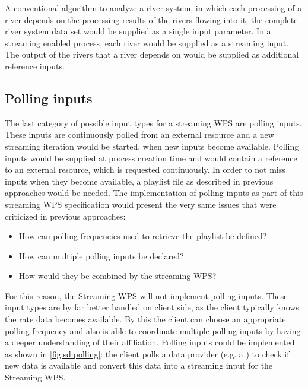     A conventional algorithm to analyze a river system, in which each processing of a river depends on the processing results of the rivers flowing into it, the complete river system data set would be supplied as a single input parameter. In a streaming enabled process, each river would be supplied as a streaming input. The output of the rivers that a river depends on would be supplied as additional reference inputs.

  \subsection{Polling inputs}
    \label{sec:stream:input:polling}
    The last category of possible input types for a streaming \ac{WPS} are polling inputs. These inputs are continuously polled from an external resource and a new streaming iteration would be started, when new inputs become available. Polling inputs would be supplied at process creation time and would contain a reference to an external resource, which is requested continuously. In order to not miss inputs when they become available, a playlist file as described in previous approaches \citep{foerster2012live} would be needed. The implementation of polling inputs as part of this streaming \ac{WPS} specification would present the very same issues that were criticized in previous approaches:
    \begin{itemize}
      \item How can polling frequencies used to retrieve the playlist be defined?
      \item How can multiple polling inputs be declared?
      \item How would they be combined by the streaming \ac{WPS}?
    \end{itemize}
    For this reason, the Streaming \ac{WPS} will not implement polling inputs. These input types are by far better handled on client side, as the client typically knows the rate data becomes available. By this the client can choose an appropriate polling frequency and also is able to coordinate multiple polling inputs by having a deeper understanding of their affiliation. Polling inputs could be implemented as shown in \cref{fig:sd:polling}: the client polls a data provider (e.g. a ) to check if new data is available and convert this data into a streaming input for the Streaming \ac{WPS}.


